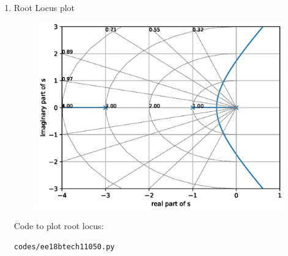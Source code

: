 \begin{enumerate}[label=\thesection.\arabic*.,ref=\thesection.\theenumi]
\item Root Locus plot
    \begin{figure}[!h]
        \includegraphics[width=\columnwidth]{./figs/ee18btech11050.eps}
    \end{figure}
	
Code to plot root locus:
\begin{lstlisting}
codes/ee18btech11050.py
\end{lstlisting}    

\end{enumerate}
